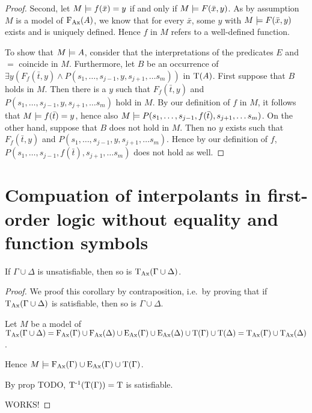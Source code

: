 \begin{proof}
	Second, let $M\models f(\bar x) = y$ if and only if $M\models F(\bar x, y)$.
	As by assumption $M$ is a model of $\operatorname{F_{Ax}}(A)$, we know that for every $\bar x$, some $y$ with $M\models F(\bar x, y)$ exists and is uniquely defined.
	Hence $f$ in $M$ refers to a well-defined function.

	To show that $M \models A$, consider that the interpretations of the predicates $E$ and $=$ coincide in $M$.
	Furthermore, let $B$ be an occurrence of $\exists y (F_f(\bar t, y) \land\allowbreak P(s_1, \ldots, s_{j-1}, y, s_{j+1}, \ldots s_m))$ in $\operatorname{T}(A)$.
	First suppose that $B$ holds in $M$.
	Then there is a $y$ such that $F_f(\bar t, y)$ and $P(s_1, \ldots, s_{j-1}, y, s_{j+1}, \ldots s_m)$ hold in $M$. 
	By our definition of $f$ in $M$, it follows that $M \models f(\bar t) = y$, hence also
	$M \models P(s_1, \ldots, s_{j-1}, f(\bar t), s_{j+1}, \ldots s_m)$.
	On the other hand, suppose that $B$ does not hold in $M$.
	Then no $y$ exists such that $F_f(\bar t, y)$ and $P(s_1, \ldots, s_{j-1}, y, s_{j+1}, \ldots s_m)$. 
	Hence by our definition of $f$, $P(s_1, \ldots, s_{j-1}, f(\bar t), s_{j+1}, \ldots s_m)$ does not hold as well.
\end{proof}







\section{Compuation of interpolants in first-order logic without equality and function symbols}

\begin{corr}
	If $\Gamma \cup \Delta$ is unsatisfiable, then so is $\operatorname{\operatorname{T}_{Ax}}(\Gamma \cup \Delta)$. 
	\label{prop:trans_sat_equiv_set}
\end{corr}
\begin{proof}
	We proof this corollary by contraposition, i.e.\ by proving that if $\operatorname{\operatorname{T}_{Ax}}(\Gamma \cup \Delta)$ is satisfiable, then so is $\Gamma \cup \Delta$.

	Let $M$ be a model of $\operatorname{\operatorname{T}_{Ax}}(\Gamma \cup \Delta) = \operatorname{F_{Ax}}(\Gamma)\cup\operatorname{F_{Ax}}(\Delta) \cup \operatorname{E_{Ax}}(\Gamma)\cup \operatorname{E_{Ax}}(\Delta) \cup \operatorname{T}(\Gamma ) \cup \operatorname{T}(\Delta) = \operatorname{\operatorname{T}_{Ax}}(\Gamma) \cup \operatorname{\operatorname{T}_{Ax}}(\Delta) $ .

	Hence $M \models \operatorname{F_{Ax}}(\Gamma) \cup \operatorname{E_{Ax}}(\Gamma) \cup \operatorname{T}(\Gamma)$.


	
	By prop TODO, $\operatorname{T^{-1}}(\operatorname{T}(\Gamma)) = \operatorname{T}$ is satisfiable.

	WORKS!
	
\end{proof}


